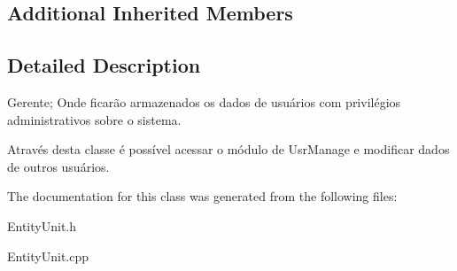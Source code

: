 \subsection*{Additional Inherited Members}


\subsection{Detailed Description}
Gerente; Onde ficarão armazenados os dados de usuários com privilégios administrativos sobre o sistema. 

Através desta classe é possível acessar o módulo de Usr\-Manage e modificar dados de outros usuários. 

The documentation for this class was generated from the following files\-:\begin{DoxyCompactItemize}
\item 
Entity\-Unit.\-h\item 
Entity\-Unit.\-cpp\end{DoxyCompactItemize}
